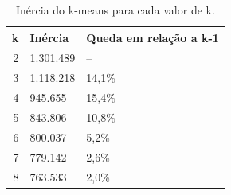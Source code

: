 \begin{table}[htbp]
\caption{Inércia do k-means para cada valor de k.}
\label{tab:cotovelo}
\begin{tabular}{rll}
\toprule
k & Inércia & Queda em relação a k-1 \\
\midrule
2 & 1.301.489 & -- \\
3 & 1.118.218 & 14,1\% \\
4 & 945.655 & 15,4\% \\
5 & 843.806 & 10,8\% \\
6 & 800.037 & 5,2\% \\
7 & 779.142 & 2,6\% \\
8 & 763.533 & 2,0\% \\
\bottomrule
\end{tabular}
\end{table}
